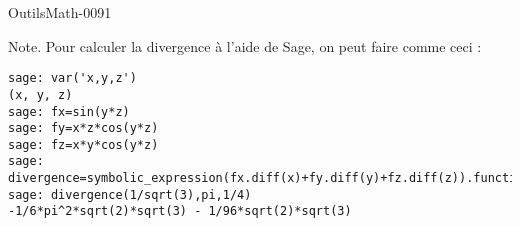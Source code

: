\begin{corrige}{OutilsMath-0091}
\begin{enumerate}
    \end{enumerate}
    
    Note. Pour calculer la divergence à l'aide de Sage, on peut faire comme ceci :
    \begin{verbatim}
sage: var('x,y,z')
(x, y, z)
sage: fx=sin(y*z)
sage: fy=x*z*cos(y*z)
sage: fz=x*y*cos(y*z)
sage: divergence=symbolic_expression(fx.diff(x)+fy.diff(y)+fz.diff(z)).function(x,y,z)
sage: divergence(1/sqrt(3),pi,1/4)
-1/6*pi^2*sqrt(2)*sqrt(3) - 1/96*sqrt(2)*sqrt(3)
    \end{verbatim}

\end{corrige}
